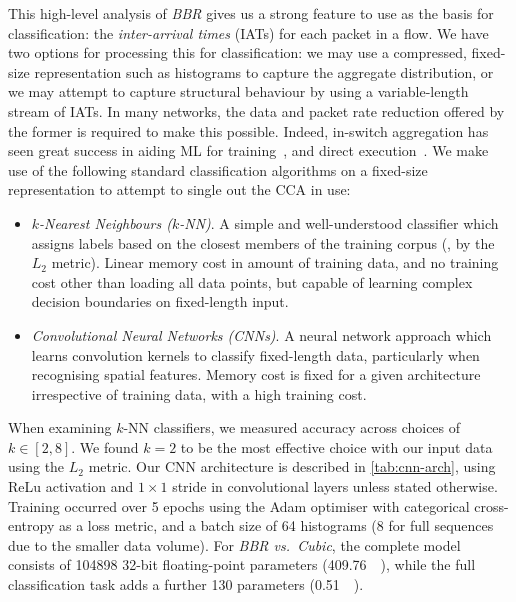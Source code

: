 This high-level analysis of \emph{BBR} gives us a strong feature to use as the basis for classification: the \emph{inter-arrival times} (IATs) for each packet in a flow.
We have two options for processing this for classification: we may use a compressed, fixed-size representation such as histograms to capture the aggregate distribution, or we may attempt to capture structural behaviour by using a variable-length stream of IATs.
In many networks, the data and packet rate reduction offered by the former is required to make this possible.
Indeed, in-switch aggregation has seen great success in aiding ML for training~\parencite{DBLP:conf/isca/LiLYCSH19}, and direct execution~\parencite{DBLP:conf/hotnets/XiongZ19}.
We make use of the following standard classification algorithms on a fixed-size representation to attempt to single out the CCA in use:

\begin{itemize}
    \item \emph{$k$-Nearest Neighbours ($k$-NN)}. A simple and well-understood classifier which assigns labels based on the closest members of the training corpus (\ie, by the $L_2$ metric). Linear memory cost in amount of training data, and no training cost other than loading all data points, but capable of learning complex decision boundaries on fixed-length input.
    
    \item \emph{Convolutional Neural Networks (CNNs)}. A neural network approach which learns convolution kernels to classify fixed-length data, particularly when recognising spatial features. Memory cost is fixed for a given architecture irrespective of training data, with a high training cost.
\end{itemize}

When examining $k$-NN classifiers, we measured accuracy across choices of $k \in \left[2, 8\right]$.
We found $k=2$ to be the most effective choice with our input data using the $L_2$ metric.
Our CNN architecture is described in \cref{tab:cnn-arch}, using ReLu activation and $1 \times 1$ stride in convolutional layers unless stated otherwise.
Training occurred over 5 epochs using the Adam optimiser with categorical cross-entropy as a loss metric, and a batch size of \num{64} histograms (\num{8} for full sequences due to the smaller data volume).
For \emph{BBR vs.\ Cubic}, the complete model consists of \num{104898} 32-bit floating-point parameters (\SI{409.76}{\kibi\byte}), while the full classification task adds a further \num{130} parameters (\SI{0.51}{\kibi\byte}).

